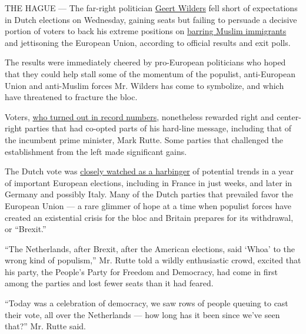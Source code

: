 THE HAGUE --- The far-right politician
\href{https://www.nytimes.com/2017/02/27/world/europe/geert-wilders-reclusive-provocateur-rises-before-dutch-vote.html?action=click\&contentCollection=Europe\&module=RelatedCoverage\&region=Marginalia\&pgtype=article}{Geert
Wilders} fell short of expectations in Dutch elections on Wednesday,
gaining seats but failing to persuade a decisive portion of voters to
back his extreme positions on
\href{https://www.nytimes.com/2017/03/13/world/europe/netherlands-election-muslims.html?action=click\&contentCollection=Europe\&module=RelatedCoverage\&region=Marginalia\&pgtype=article}{barring
Muslim immigrants} and jettisoning the European Union, according to
official results and exit polls.

The results were immediately cheered by pro-European politicians who
hoped that they could help stall some of the momentum of the populist,
anti-European Union and anti-Muslim forces Mr. Wilders has come to
symbolize, and which have threatened to fracture the bloc.

Voters,
\href{https://www.nytimes.com/2017/03/15/world/europe/dutch-elections.html}{who
turned out in record numbers}, nonetheless rewarded right and
center-right parties that had co-opted parts of his hard-line message,
including that of the incumbent prime minister, Mark Rutte. Some parties
that challenged the establishment from the left made significant gains.

The Dutch vote was
\href{https://www.nytimes.com/2017/03/15/world/europe/dutch-vote-watched-across-europe-with-a-finger-in-the-wind.html?hp\&action=click\&pgtype=Homepage\&clickSource=story-heading\&module=second-column-region\&region=top-news\&WT.nav=top-news}{closely
watched as a harbinger} of potential trends in a year of important
European elections, including in France in just weeks, and later in
Germany and possibly Italy. Many of the Dutch parties that prevailed
favor the European Union --- a rare glimmer of hope at a time when
populist forces have created an existential crisis for the bloc and
Britain prepares for its withdrawal, or ``Brexit.''

``The Netherlands, after Brexit, after the American elections, said
`Whoa' to the wrong kind of populism,'' Mr. Rutte told a wildly
enthusiastic crowd, excited that his party, the People's Party for
Freedom and Democracy, had come in first among the parties and lost
fewer seats than it had feared.

``Today was a celebration of democracy, we saw rows of people queuing to
cast their vote, all over the Netherlands --- how long has it been since
we've seen that?'' Mr. Rutte said.


